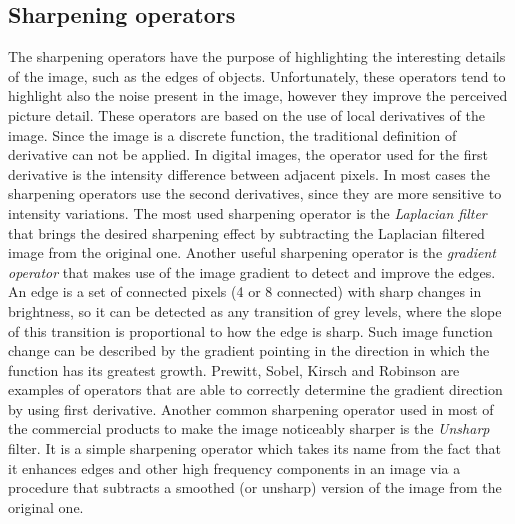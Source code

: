 \documentclass[final,a4paper,12pt,english]{UnicaPhdThesis3}
\begin{document}
	\subsection{Sharpening operators} %
	The sharpening operators have the purpose of highlighting the interesting details of the image, such as the edges of objects. Unfortunately, these operators tend to highlight also the noise present in the image, however they improve the perceived picture detail. These operators are based on the use of local derivatives of the image. Since the image is a discrete function, the traditional definition of derivative can not be applied.
	In digital images, the operator used for the first derivative is the intensity difference between adjacent pixels. In most cases the sharpening operators use the second derivatives, since they are more sensitive to intensity variations. The most used sharpening operator is the \textit{Laplacian filter} that brings the desired sharpening effect by subtracting the Laplacian filtered image from the original one. Another useful sharpening operator is the \textit{gradient operator} that makes use of the image gradient to detect and improve the edges. An edge is a set of connected pixels (4 or 8 connected) with sharp changes in brightness, so it can be detected as any transition of grey levels, where the slope of this transition is proportional to how the edge is sharp. Such image function change can be described by the gradient pointing in the direction in which the function has its greatest growth. Prewitt, Sobel, Kirsch and Robinson are examples of operators that are able to correctly determine the gradient direction by using first derivative. Another common sharpening operator used in most of the commercial products to make the image noticeably sharper is the \textit{Unsharp} filter. It is a simple sharpening operator which takes its name from the fact that it enhances edges and other high frequency components in an image via a procedure that subtracts a smoothed (or unsharp) version of the image from the original one. 
	
\end{document}
